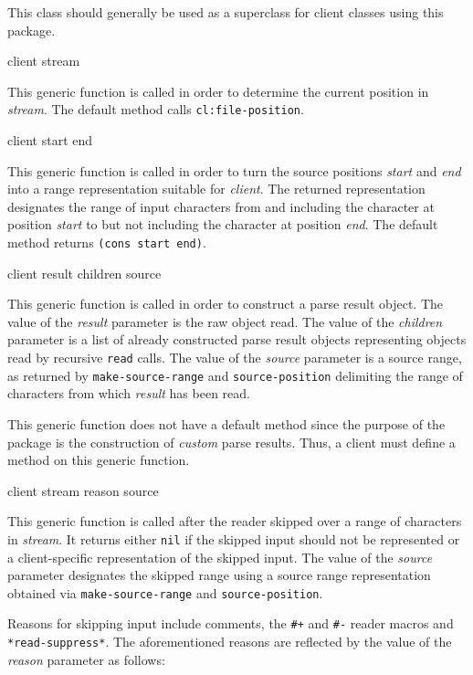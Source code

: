 
This class should generally be used as a superclass for client classes
using this package.

 {client stream}

This generic function is called in order to determine the current
position in \textit{stream}.  The default method calls
\texttt{cl:file-position}.

 {client start end}

This generic function is called in order to turn the source positions
\textit{start} and \textit{end} into a range representation suitable
for \textit{client}.  The returned representation designates the range
of input characters from and including the character at position
\textit{start} to but not including the character at position
\textit{end}.  The default method returns \texttt{(cons start end)}.

 {client result children source}

This generic function is called in order to construct a parse result
object.  The value of the \textit{result} parameter is the raw object
read.  The value of the \textit{children} parameter is a list of
already constructed parse result objects representing objects read by
recursive \texttt{read} calls.  The value of the \textit{source}
parameter is a source range, as returned by \texttt{make-source-range}
and \texttt{source-position} delimiting the range of characters from
which \textit{result} has been read.

This generic function does not have a default method since the purpose
of the package is the construction of \emph{custom} parse results.
Thus, a client must define a method on this generic function.

 {client stream reason source}

This generic function is called after the reader skipped over a range
of characters in \textit{stream}.  It returns either \texttt{nil} if
the skipped input should not be represented or a client-specific
representation of the skipped input.  The value of the \textit{source}
parameter designates the skipped range using a source range
representation obtained via \texttt{make-source-range} and
\texttt{source-position}.

Reasons for skipping input include comments, the \texttt{\#+} and
\texttt{\#-} reader macros and \texttt{*read-suppress*}.  The
aforementioned reasons are reflected by the value of the
\textit{reason} parameter as follows:

